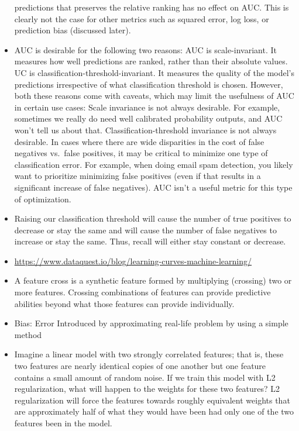 \documentclass[]{book}
\theoremstyle{definition}
\theoremstyle{definition}
\theoremstyle{definition}
\theoremstyle{remark}
\begin{document}
\begin{itemize}
  predictions that preserves the relative ranking has no effect on AUC.
  This is clearly not the case for other metrics such as squared error,
  log loss, or prediction bias (discussed later).
\item
  AUC is desirable for the following two reasons: AUC is
  scale-invariant. It measures how well predictions are ranked, rather
  than their absolute values. UC is classification-threshold-invariant.
  It measures the quality of the model's predictions irrespective of
  what classification threshold is chosen. However, both these reasons
  come with caveats, which may limit the usefulness of AUC in certain
  use cases: Scale invariance is not always desirable. For example,
  sometimes we really do need well calibrated probability outputs, and
  AUC won't tell us about that. Classification-threshold invariance is
  not always desirable. In cases where there are wide disparities in the
  cost of false negatives vs.~false positives, it may be critical to
  minimize one type of classification error. For example, when doing
  email spam detection, you likely want to prioritize minimizing false
  positives (even if that results in a significant increase of false
  negatives). AUC isn't a useful metric for this type of optimization.
\item
  Raising our classification threshold will cause the number of true
  positives to decrease or stay the same and will cause the number of
  false negatives to increase or stay the same. Thus, recall will either
  stay constant or decrease.
\item
  \url{https://www.dataquest.io/blog/learning-curves-machine-learning/}
\item
  A feature cross is a synthetic feature formed by multiplying
  (crossing) two or more features. Crossing combinations of features can
  provide predictive abilities beyond what those features can provide
  individually.
\item
  Bias: Error Introduced by approximating real-life problem by using a
  simple method
\item
  Imagine a linear model with two strongly correlated features; that is,
  these two features are nearly identical copies of one another but one
  feature contains a small amount of random noise. If we train this
  model with L2 regularization, what will happen to the weights for
  these two features? L2 regularization will force the features towards
  roughly equivalent weights that are approximately half of what they
  would have been had only one of the two features been in the model.

\end{itemize}
\end{document}
